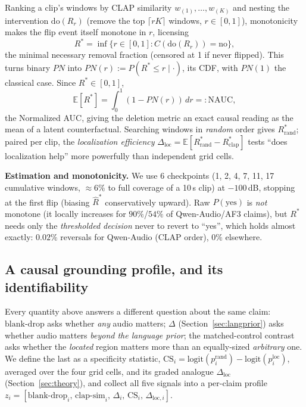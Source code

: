 \documentclass{article}
\begin{document}
Ranking a clip's windows by CLAP similarity $w_{(1)},\dots,w_{(K)}$ and
nesting the intervention $\mathrm{do}(R_r)$ (remove the top $\lceil
rK\rceil$ windows, $r\in[0,1]$), monotonicity makes the flip event itself
monotone in $r$, licensing
\begin{equation}
R^\ast = \inf\{r \in [0,1] : C(\mathrm{do}(R_r)) = \text{no}\},
\end{equation}
the minimal necessary removal fraction (censored at 1 if never flipped).
This turns binary $PN$ into $PN(r):=P(R^\ast\le r\mid\cdot)$, its CDF,
with $PN(1)$ the classical case. Since $R^\ast\in[0,1]$,
\begin{equation}
\mathbb{E}[R^\ast] = \int_0^1 (1-PN(r))\,dr =: \mathrm{NAUC},
\end{equation}
the Normalized AUC, giving the deletion metric
\cite{petsiuk2018rise,fong2019extremal} an exact causal reading as the
mean of a latent counterfactual. Searching windows in \emph{random}
order gives $R^\ast_{\text{rand}}$; paired per clip, the
\emph{localization efficiency}
$\Delta_{\text{loc}}=\mathbb{E}[R^\ast_{\text{rand}}-R^\ast_{\text{clap}}]$
tests ``does
localization help'' more powerfully than independent grid cells.

\textbf{Estimation and monotonicity.} We use 6 checkpoints (1, 2, 4,
7, 11, 17 cumulative windows, $\approx\!6\%$ to full coverage of
a 10\,s clip) at $-100$\,dB, stopping at the first flip (biasing $\hat
R^\ast$ conservatively upward). Raw $P(\text{yes})$ is \emph{not}
monotone (it locally increases for $90\%$/$54\%$ of Qwen-Audio/AF3
claims), but $R^\ast$ needs only the \emph{thresholded decision} never
to revert to ``yes'', which holds almost exactly: $0.02\%$ reversals
for Qwen-Audio (CLAP order), $0\%$ elsewhere.

\subsection{A causal grounding profile, and its identifiability}\label{sec:profile}
Every quantity above answers a different question about the same claim:
$\mathrm{blank\text{-}drop}$ asks whether \emph{any} audio matters;
$\Delta$ (Section~\ref{sec:langprior}) asks whether audio matters
\emph{beyond the language prior}; the matched-control contrast asks
whether the \emph{located} region matters more than an equally-sized
\emph{arbitrary} one. We define the last as a specificity statistic,
$\mathrm{CS}_i = \mathrm{logit}(p^{\text{rand}}_i) -
\mathrm{logit}(p^{\text{loc}}_i)$, averaged over the four grid cells, and
its graded analogue $\Delta_{\text{loc}}$ (Section~\ref{sec:theory}), and
collect all five signals into a per-claim profile $z_i =
[\mathrm{blank\text{-}drop}_i,\,\mathrm{clap\text{-}sim}_i,\,\Delta_i,\,
\mathrm{CS}_i,\,\Delta_{\text{loc},i}]$.
\end{document}
